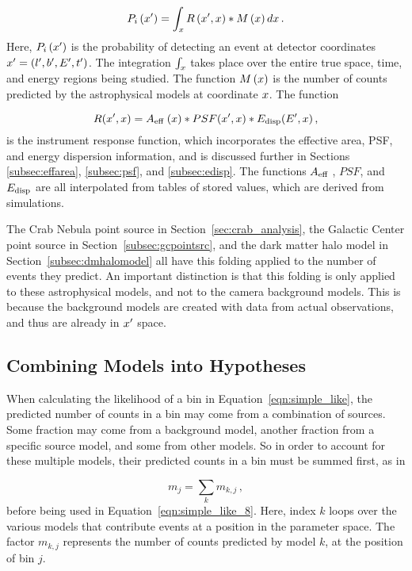 \begin{equation}\label{eqn:folding}
  P_i \left( x' \right ) = \int_x R \left ( x', x \right ) * M \left ( x \right ) dx \,.
\end{equation}
Here, $P_i \left( x' \right )$ is the probability of detecting an event at detector coordinates $x' = \left ( l', b', E', t' \right )$.
The integration $\int_x$ takes place over the entire true space, time, and energy regions being studied.
The function $M\left ( x \right )$ is the number of counts predicted by the astrophysical models at coordinate $x$.
The function

\begin{equation}\label{eqn:foldingR}
  R(x',x) = A_\textrm{eff }(x) * PSF(x',x) * E_\textrm{disp}(E',x) \,,
\end{equation}
is the instrument response function, which incorporates the effective area, PSF, and energy dispersion information, and is discussed further in Sections \ref{subsec:effarea}, \ref{subsec:psf}, and \ref{subsec:edisp}.
The functions $A_\textrm{eff }$, $PSF$, and $E_\textrm{disp}$ are all interpolated from tables of stored values, which are derived from simulations.

The Crab Nebula point source in Section~\ref{sec:crab_analysis}, the Galactic Center point source in Section~\ref{subsec:gcpointsrc}, and the dark matter halo model in Section~\ref{subsec:dmhalomodel} all have this folding applied to the number of events they predict.
An important distinction is that this folding is only applied to these astrophysical models, and not to the camera background models.
This is because the background models are created with data from actual observations, and thus are already in $x'$ space.

\subsection{Combining Models into Hypotheses}\label{subsec:hypotheses}

When calculating the likelihood of a bin in Equation~\ref{eqn:simple_like}, the predicted number of counts in a bin may come from a combination of sources.
Some fraction may come from a background model, another fraction from a specific source model, and some from other models.
So in order to account for these multiple models, their predicted counts in a bin must be summed first, as in 

\begin{equation}\label{eqn:combinemodels}
  m_{j} = \sum_k m_{k,j} \,,
\end{equation}
before being used in Equation~\ref{eqn:simple_like_8}.
Here, index $k$ loops over the various models that contribute events at a position in the parameter space.
The factor $m_{k,j}$ represents the number of counts predicted by model $k$, at the position of bin $j$.


